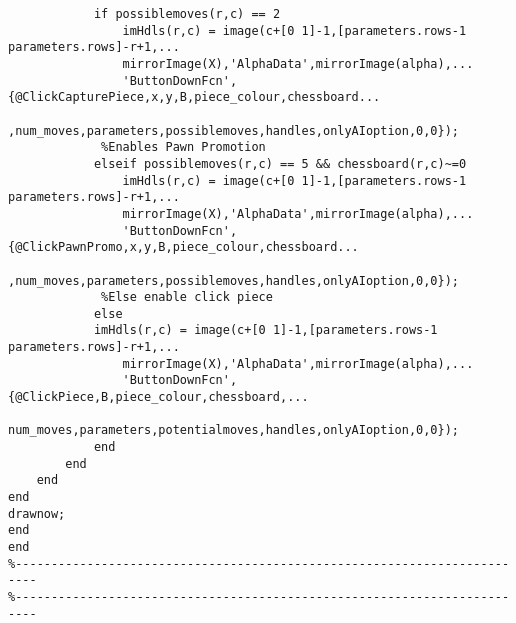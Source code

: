 \documentclass{article}
\begin{document}
\begin{lstlisting}
            if possiblemoves(r,c) == 2
                imHdls(r,c) = image(c+[0 1]-1,[parameters.rows-1 parameters.rows]-r+1,...
                mirrorImage(X),'AlphaData',mirrorImage(alpha),...
                'ButtonDownFcn',{@ClickCapturePiece,x,y,B,piece_colour,chessboard...
                 ,num_moves,parameters,possiblemoves,handles,onlyAIoption,0,0});
             %Enables Pawn Promotion
            elseif possiblemoves(r,c) == 5 && chessboard(r,c)~=0
                imHdls(r,c) = image(c+[0 1]-1,[parameters.rows-1 parameters.rows]-r+1,...
                mirrorImage(X),'AlphaData',mirrorImage(alpha),...
                'ButtonDownFcn',{@ClickPawnPromo,x,y,B,piece_colour,chessboard...
                 ,num_moves,parameters,possiblemoves,handles,onlyAIoption,0,0});
             %Else enable click piece
            else
            imHdls(r,c) = image(c+[0 1]-1,[parameters.rows-1 parameters.rows]-r+1,...
                mirrorImage(X),'AlphaData',mirrorImage(alpha),...
                'ButtonDownFcn',{@ClickPiece,B,piece_colour,chessboard,...
                num_moves,parameters,potentialmoves,handles,onlyAIoption,0,0});
            end
        end
    end
end
drawnow;
end
end
%-------------------------------------------------------------------------
%-------------------------------------------------------------------------

\end{lstlisting}
\end{document}
